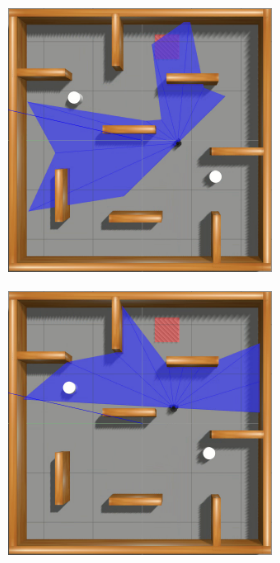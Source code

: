 \begin{figure}[H]
\begin{center}
\begin{subfigure}[b]{0.60\textwidth}
\begin{subfigure}[b]{0.24\textwidth}
            \includegraphics[width=\textwidth]{imagens/simulated_envs/sim_env3_ddpg/2.png}
        \end{subfigure}
        \hfill
        \begin{subfigure}[b]{0.24\textwidth}
            \includegraphics[width=\textwidth]{imagens/simulated_envs/sim_env3_ddpg/3.png}

\end{subfigure}
\end{subfigure}
\end{center}
\end{figure}
